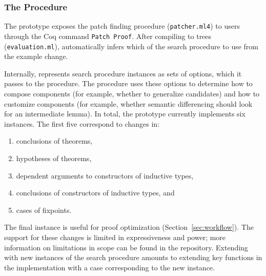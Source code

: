 \subsubsection{The Procedure}
\label{sec:pumpkin-impl-procedure}

The \sysname prototype exposes the patch finding procedure (\lstinline{patcher.ml4}) to users through the Coq command \lstinline{Patch Proof}. 
After compiling to trees (\lstinline{evaluation.ml}),
\sysname automatically infers which  of the search procedure to use from the example change. %


Internally, \sysname represents search procedure instances as sets of options,
which it passes to the procedure. The procedure uses these options to determine
how to compose components (for example, whether to generalize candidates) 
and how to customize components (for example, whether semantic differencing should look for an intermediate lemma).
In total, the \sysname prototype currently implements six instances.
The first five correspond to changes in:

\begin{enumerate}
\item conclusions of theorems,
\item hypotheses of theorems,
\item dependent arguments to constructors of inductive types, 
\item conclusions of constructors of inductive types, and
\item cases of fixpoints.
\end{enumerate}
The final instance is useful for proof optimization (Section~\ref{sec:workflow}).
The support for these changes is limited in expressiveness and power;
more information on limitations in scope can be found in the repository. %
Extending \sysname with new instances of the search procedure amounts to extending key functions in the implementation
with a case corresponding to the new instance.

